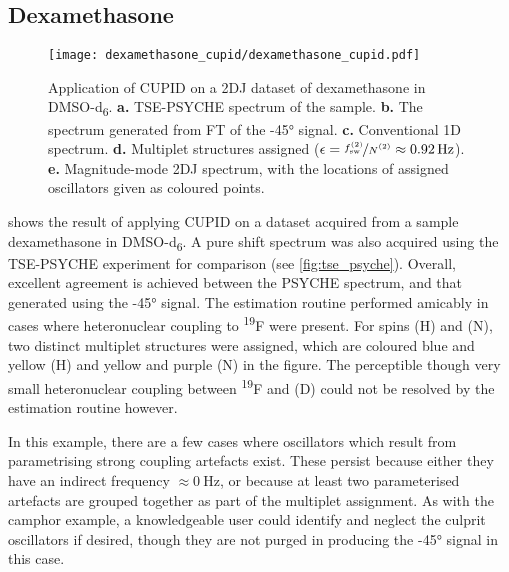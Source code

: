 \subsection{Dexamethasone}
\begin{sidewaysfigure}%
    \centering%
    \texttt{[image: dexamethasone\_cupid/dexamethasone\_cupid.pdf]}%
    \caption[
        Application of \acs{CUPID} on a dexamethasone dataset.
    ]{
        Application of \acs{CUPID} on a \ac{2DJ} dataset of dexamethasone in
        \ac{DMSO}-d\textsubscript{6}.
        \textbf{a.} \acs{TSE-PSYCHE} spectrum of the sample.
        \textbf{b.} The spectrum generated from \ac{FT} of the \ang{-45}
        signal.
        \textbf{c.} Conventional \acs{1D} spectrum.
        \textbf{d.} Multiplet structures assigned ($\epsilon =
        \nicefrac{\fswtwo}{\Ntwo} \approx \qty{0.92}{\hertz}$).
        \textbf{e.} Magnitude-mode \acs{2DJ} spectrum, with the locations of
        assigned oscillators given as coloured points.
    }
    \label{fig:dexamethasone-cupid}%
\end{sidewaysfigure}%

 shows the result of applying CUPID on a
dataset acquired from a sample dexamethasone in DMSO-d\textsubscript{6}. A
pure shift spectrum was also acquired using the
\ac{TSE-PSYCHE} experiment\cite{Foroozandeh2018,Foroozandeh2015} for
comparison (see \cref{fig:tse_psyche}). Overall, excellent agreement is
achieved between the \ac{PSYCHE}
spectrum, and that generated using the \ang{-45} signal. The estimation routine
performed amicably in cases where heteronuclear coupling to
\textsuperscript{19}F were present. For spins (H) and (N), two distinct
multiplet structures were assigned, which are coloured blue and yellow (H) and
yellow and purple (N) in the figure. The perceptible though very small
heteronuclear coupling between \textsuperscript{19}F and (D) could not be
resolved by the estimation routine however.

In this example, there are a few cases where oscillators which result from
parametrising strong coupling artefacts exist. These persist because
either they have an indirect frequency $\approx \qty{0}{\hertz}$, or because at
least two parameterised artefacts are grouped together as part of the multiplet
assignment. As with the camphor example, a knowledgeable user could identify
and neglect the culprit oscillators if desired, though they are not purged in
producing the \ang{-45} signal in this case.


